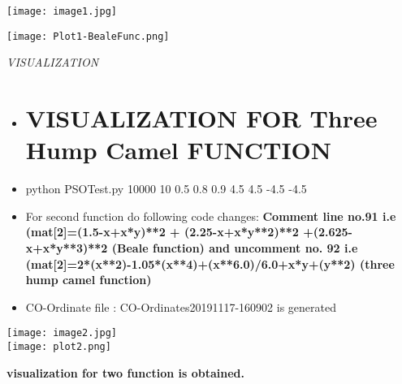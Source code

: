 \documentclass{article}
\begin{document}
\begin{center}
\begin{center}
\begin{center}
\begin{minipage}{33em}
\begin{itemize}
\end{itemize}
\end{minipage}
\end{center}

    \texttt{[image: image1.jpg]}
    \label{fig:gnuplotforbeale}
    
    \texttt{[image: Plot1-BealeFunc.png]}
    \label{fig:plotBeale}
    

\end{center}
\newpage

\begin{center}

\begin{center}
\emph{\LARGE VISUALIZATION}\\[0.5cm]
    
\end{center}
\begin{center}
\begin{minipage}{33em}
\noindent


\begin{itemize}
\item 

\section*{VISUALIZATION FOR Three Hump Camel FUNCTION}


\item python PSOTest.py 10000 10 0.5 0.8 0.9 4.5 4.5 -4.5 -4.5
\item For second function do following code changes:
\textbf{Comment line no.91 i.e (mat[2]=(1.5-x+x*y)**2 + (2.25-x+x*y**2)**2 +(2.625-x+x*y**3)**2 (Beale  function) and uncomment no. 92 i.e (mat[2]=2*(x**2)-1.05*(x**4)+(x**6.0)/6.0+x*y+(y**2)  (three hump camel function)}

\item CO-Ordinate file : CO-Ordinates20191117-160902 is generated


\end{itemize}
\end{minipage}
\end{center}

    \texttt{[image: image2.jpg]}
    \label{fig:gnuplotforbeale}
    \\[3pt]
    \texttt{[image: plot2.png]}
    \label{fig:plotBeale}
    \\[2pt]
\begin{flushleft}
    \LARGE
\textbf{visualization for two function is obtained. }
\end{flushleft}


\end{center}
\end{center}
\end{document}
